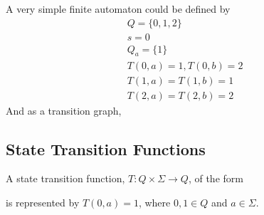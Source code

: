 \begin{example*}{}{}
  A very simple finite automaton could be defined by
  \begin{gather*}
    Q = \{0, 1, 2\}\\
    s = 0\\
    Q_a = \{1\}\\
    T(0,a) = 1, T(0,b) = 2\\
    T(1, a) = T(1, b) = 1\\
    T(2, a) = T(2, b) = 2
  \end{gather*}
  And as a transition graph,


\end{example*}

\subsection*{State Transition Functions}

A state transition function, $T : Q \times \Sigma \rightarrow Q$, of the form
\begin{figure}
\end{figure}
is represented by $T(0, a) = 1$, where $0, 1 \in Q$ and $a \in \Sigma$.

